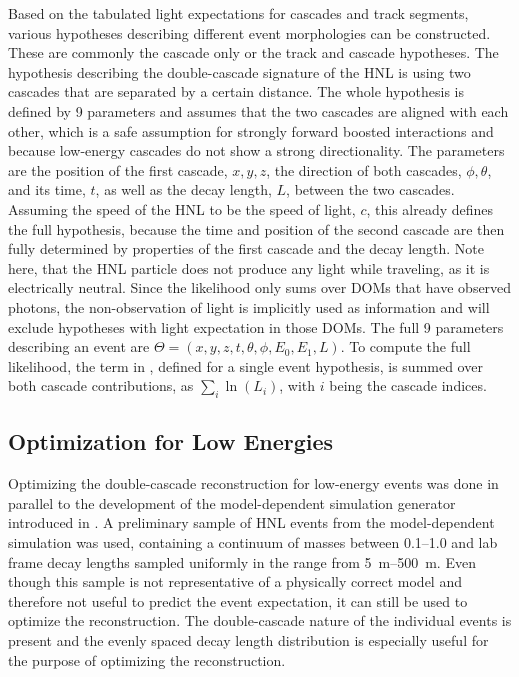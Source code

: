 Based on the tabulated light expectations for cascades and track segments, various hypotheses describing different event morphologies can be constructed. These are commonly the cascade only or the track and cascade hypotheses. The hypothesis describing the double-cascade signature of the HNL is using two cascades that are separated by a certain distance. The whole hypothesis is defined by 9 parameters and assumes that the two cascades are aligned with each other, which is a safe assumption for strongly forward boosted interactions and because low-energy cascades do not show a strong directionality. The parameters are the position of the first cascade, $x, y, z$, the direction of both cascades, $\phi, \theta$, and its time, $t$, as well as the decay length, $L$, between the two cascades. Assuming the speed of the HNL to be the speed of light, $c$, this already defines the full hypothesis, because the time and position of the second cascade are then fully determined by properties of the first cascade and the decay length. Note here, that the HNL particle does not produce any light while traveling, as it is electrically neutral. Since the likelihood only sums over DOMs that have observed photons, the non-observation of light is implicitly used as information and will exclude hypotheses with light expectation in those DOMs. The full 9 parameters describing an event are $\Theta = (x, y, z, t, \theta, \phi, E_0, E_1, L)$. To compute the full likelihood, the term in , defined for a single event hypothesis, is summed over both cascade contributions, as $\sum_i \ln(L_i)$, with $i$ being the cascade indices.


\subsection{Optimization for Low Energies}

Optimizing the double-cascade reconstruction for low-energy events was done in parallel to the development of the model-dependent simulation generator introduced in . A preliminary sample of HNL events from the model-dependent simulation was used, containing a continuum of masses between \SIrange[range-phrase=~and~]{0.1}{1.0}{\gev} and lab frame decay lengths sampled uniformly in the range from \SIrange{5}{500}{\meter}. Even though this sample is not representative of a physically correct model and therefore not useful to predict the event expectation, it can still be used to optimize the reconstruction. The double-cascade nature of the individual events is present and the evenly spaced decay length distribution is especially useful for the purpose of optimizing the reconstruction.

